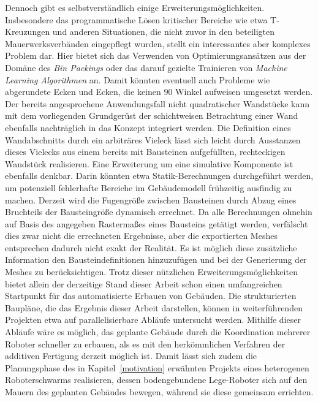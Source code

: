 Dennoch gibt es selbstverständlich einige Erweiterungsmöglichkeiten.
Insbesondere das programmatische Lösen kritischer Bereiche wie etwa T-Kreuzungen und anderen Situationen, die nicht zuvor in den beteiligten Mauerwerksverbänden eingepflegt wurden, stellt ein interessantes aber komplexes Problem dar.
Hier bietet sich das Verwenden von Optimierungsansätzen aus der Domäne des \textit{Bin Packings} oder das darauf gezielte Trainieren von \textit{Machine Learning Algorithmen} an.
Damit könnten eventuell auch Probleme wie abgerundete Ecken und Ecken, die keinen 90\textdegree{} Winkel aufweisen umgesetzt werden.
Der bereits angesprochene Anwendungsfall nicht quadratischer Wandstücke kann mit dem vorliegenden Grundgerüst der schichtweisen Betrachtung einer Wand ebenfalls nachträglich in das Konzept integriert werden.
Die Definition eines Wandabschnitts durch ein arbiträres Vieleck lässt sich leicht durch \glqq{}Ausstanzen\grqq{} dieses Vielecks aus einem bereits mit Bausteinen aufgefüllten, rechteckigen Wandstück realisieren.
Eine Erweiterung um eine simulative Komponente ist ebenfalls denkbar.
Darin könnten etwa Statik-Berechnungen durchgeführt werden, um potenziell fehlerhafte Bereiche im Gebäudemodell frühzeitig ausfindig zu machen.
Derzeit wird die Fugengröße zwischen Bausteinen durch Abzug eines Bruchteils der Bausteingröße dynamisch errechnet.
Da alle Berechnungen ohnehin auf Basis des angegeben Rastermaßes eines Bausteins getätigt werden, verfälscht dies zwar nicht die errechneten Ergebnisse, aber die exportierten Meshes entsprechen dadurch nicht exakt der Realität.
Es ist möglich diese zusätzliche Information den Bausteindefinitionen hinzuzufügen und bei der Generierung der Meshes zu berücksichtigen.
Trotz dieser nützlichen Erweiterungsmöglichkeiten bietet allein der derzeitige Stand dieser Arbeit schon einen umfangreichen Startpunkt für das automatisierte Erbauen von Gebäuden.
Die strukturierten Baupläne, die das Ergebnis dieser Arbeit darstellen, können in weiterführenden Projekten etwa auf parallelisierbare Abläufe untersucht werden.
Mithilfe dieser Abläufe wäre es möglich, das geplante Gebäude durch die Koordination mehrerer Roboter schneller zu erbauen, als es mit den herkömmlichen Verfahren der additiven Fertigung derzeit möglich ist.
Damit lässt sich zudem die Planungsphase des in Kapitel~\ref{motivation} erwähnten Projekts eines heterogenen Roboterschwarms realisieren, dessen bodengebundene Lege-Roboter sich auf den Mauern des geplanten Gebäudes bewegen, während sie diese gemeinsam errichten.
